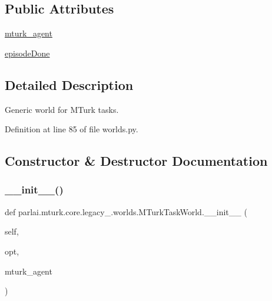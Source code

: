 \subsection*{Public Attributes}
\begin{DoxyCompactItemize}
\item 
\hyperlink{classparlai_1_1mturk_1_1core_1_1legacy__2018_1_1worlds_1_1MTurkTaskWorld_a7c4f2ef7d7f0864848d45ec22b39def7}{mturk\+\_\+agent}
\item 
\hyperlink{classparlai_1_1mturk_1_1core_1_1legacy__2018_1_1worlds_1_1MTurkTaskWorld_aa17f5e23d82dcbc26ac52ff116a370d5}{episode\+Done}
\end{DoxyCompactItemize}


\subsection{Detailed Description}
\begin{DoxyVerb}Generic world for MTurk tasks.
\end{DoxyVerb}
 

Definition at line 85 of file worlds.\+py.



\subsection{Constructor \& Destructor Documentation}
\mbox{\label{classparlai_1_1mturk_1_1core_1_1legacy__2018_1_1worlds_1_1MTurkTaskWorld_a5c2d06dd5158af58a8fbf1990f7c6d8f}} 
\subsubsection{\texorpdfstring{\+\_\+\+\_\+init\+\_\+\+\_\+()}{\_\_init\_\_()}}
{\footnotesize\ttfamily def parlai.\+mturk.\+core.\+legacy\+\_.\+worlds.\+M\+Turk\+Task\+World.\+\_\+\+\_\+init\+\_\+\+\_\+ (\begin{DoxyParamCaption}\item[{}]{self,  }\item[{}]{opt,  }\item[{}]{mturk\+\_\+agent }\end{DoxyParamCaption})}

